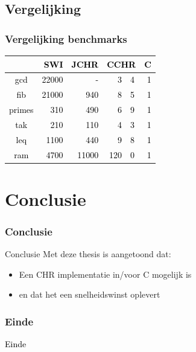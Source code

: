 \documentclass{beamer}
\newcommand{\cFront}[1]{\textcolor{black}{#1}}
\begin{document}
\subsection{Vergelijking}

\begin{frame}
\frametitle{Vergelijking benchmarks}
\begin{center}
\cFront{\begin{tabular}{|c|rrr@{.}lr|}
\hline
 & {\bf SWI} & {\bf JCHR} & \multicolumn{2}{c}{\bf CCHR} & {\bf C} \\
\hline
gcd    & 22000 & -     &   3&4  & 1 \\
fib    & 21000 & 940   &   8&5  & 1 \\
primes & 310   & 490   &   6&9  & 1 \\
tak    & 210   & 110   &   4&3  & 1 \\
leq    & 1100  & 440   &   9&8  & 1 \\
ram    & 4700  & 11000 &  120&0 & 1 \\
\hline
\end{tabular}}
\end{center}
\end{frame}

\section{Conclusie}

\begin{frame}
  \frametitle{Conclusie}
  \begin{block}{Conclusie}
    Met deze thesis is aangetoond dat:
    \begin{itemize}
      \item Een CHR implementatie in/voor C mogelijk is
      \item en dat het een snelheidswinst oplevert
    \end{itemize}
  \end{block}
\end{frame}

\begin{frame}
  \frametitle{Einde}
  \cFront{Einde}
\end{frame}
\end{document}
